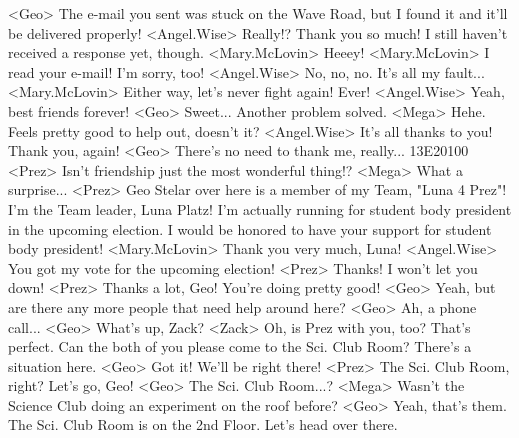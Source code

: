 <Geo> The e-mail you sent was stuck on the Wave Road, 
but I found it and it'll be delivered properly! 
<Angel.Wise> Really!? Thank you so much! 
I still haven't received a response yet, though. 
<Mary.McLovin> Heeey! 
<Mary.McLovin> I read your e-mail! I'm sorry, too! 
<Angel.Wise> No, no, no. It's all my fault... 
<Mary.McLovin> Either way, let's never fight again! Ever! 
<Angel.Wise> Yeah, best friends forever! 
<Geo> Sweet... Another problem solved. 
<Mega> Hehe. Feels pretty good to help out, doesn't it? 
<Angel.Wise> It's all thanks to you! Thank you, again! 
<Geo> There's no need to thank me, really... 
{13}{E2}{01}{00} 
<Prez> Isn't friendship just the most wonderful thing!? 
<Mega> What a surprise... 
<Prez> Geo Stelar over here is a member of my Team, "Luna 4 Prez"! 
I'm the Team leader, Luna Platz! 
I'm actually running for student body president in the upcoming election. 
I would be honored to have your support for student body president! 
<Mary.McLovin> Thank you very much, Luna! 
<Angel.Wise> You got my vote for the upcoming election! 
<Prez> Thanks! I won't let you down! 
<Prez> Thanks a lot, Geo! You're doing pretty good! 
<Geo> Yeah, but are there any more people that need help around here? 
<Geo> Ah, a phone call... 
<Geo> What's up, Zack? 
<Zack> Oh, is Prez with you, too? That's perfect. 
Can the both of you please come to the Sci. Club Room? 
There's a situation here. 
<Geo> Got it! We'll be right there! 
<Prez> The Sci. Club Room, right? Let's go, Geo! 
<Geo> The Sci. Club Room...? 
<Mega> Wasn't the Science Club doing an experiment on the roof before? 
<Geo> Yeah, that's them. 
The Sci. Club Room is on the 2nd Floor. Let's head over there. 
